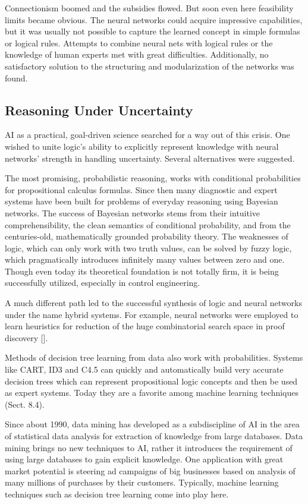 \documentclass[10pt]{book}
\begin{document}
Connectionism boomed and the subsidies flowed. But soon even here feasibility limits became obvious. The neural networks could acquire impressive capabilities, but it was usually not possible to capture the learned concept in simple formulas or logical rules. Attempts to combine neural nets with logical rules or the knowledge of human experts met with great difficulties. Additionally, no satisfactory solution to the structuring and modularization of the networks was found.

\subsection{Reasoning Under Uncertainty}
AI as a practical, goal-driven science searched for a way out of this crisis. One wished to unite logic's ability to explicitly represent knowledge with neural networks' strength in handling uncertainty. Several alternatives were suggested.

The most promising, probabilistic reasoning, works with conditional probabilities for propositional calculus formulas. Since then many diagnostic and expert systems have been built for problems of everyday reasoning using Bayesian\\
networks. The success of Bayesian networks stems from their intuitive comprehensibility, the clean semantics of conditional probability, and from the centuries-old, mathematically grounded probability theory.
The weaknesses of logic, which can only work with two truth values, can be solved by fuzzy logic, which pragmatically introduces infinitely many values between zero and one. Though even today its theoretical foundation is not totally firm, it is being successfully utilized, especially in control engineering.

A much different path led to the successful synthesis of logic and neural networks under the name hybrid systems. For example, neural networks were employed to learn heuristics for reduction of the huge combinatorial search space in proof discovery [\cite{se90}].

Methods of decision tree learning from data also work with probabilities. Systems like CART, ID3 and C4.5 can quickly and automatically build very accurate decision trees which can represent propositional logic concepts and then be used as expert systems. Today they are a favorite among machine learning techniques (Sect. 8.4).

Since about 1990, data mining has developed as a subdiscipline of AI in the area of statistical data analysis for extraction of knowledge from large databases. Data mining brings no new techniques to AI, rather it introduces the requirement of using large databases to gain explicit knowledge. One application with great market potential is steering ad campaigns of big businesses based on analysis of many millions of purchases by their customers. Typically, machine learning techniques such as decision tree learning come into play here.
\end{document}
